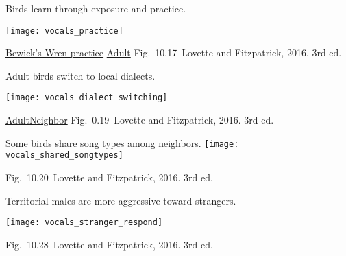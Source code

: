 \documentclass[t]{beamer}
\newcommand{\cornell}[1]{Fig.~#1~Lovette and Fitzpatrick, 2016. 3rd ed.}
\newcommand{\backskip}{\vspace{-0.5\baselineskip}}
\begin{document}

\begin{frame}{Birds learn through exposure and practice.}

\texttt{[image: vocals\_practice]}

\vfilll

\tiny \href{https://youtu.be/gVYpcFAcpLo}{Bewick's Wren practice} 
\quad
\href{https://youtu.be/bCQVNalg93Y}{Adult} \hfill  \cornell{10.17}
\end{frame}


\begin{frame}{Adult birds switch to local dialects.}
\backskip

\centering

\texttt{[image: vocals\_dialect\_switching]}

\vfilll

\tiny \href{https://youtu.be/q7P3LX0V1DQ}{Adult}\quad\href{https://youtu.be/lP7sfF9mzCU}{Neighbor} \hfill \cornell{0.19}
\end{frame}


\begin{frame}{Some birds share song types among neighbors.}
\centering
\texttt{[image: vocals\_shared\_songtypes]}

\vfilll

\tinyfill \cornell{10.20}
\end{frame}


\begin{frame}{Territorial males are more aggressive toward strangers.}

\backskip
\centering 
\texttt{[image: vocals\_stranger\_respond]}

\vfilll

\tinyfill \cornell{10.28}
\end{frame}

\end{document}
